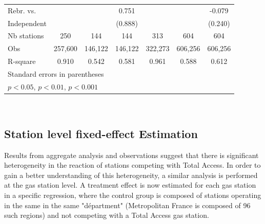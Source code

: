 \documentclass[11pt]{article}
\begin{document}
\begin{table}[h]
\begin{tabular}{lcccccc}
\hline
Rebr. vs.           &                                  &                               & 0.751                     &                                    &                                   & -0.079                      \\
Independent     &                                  &                               & (0.888)                  &                                    &                                    & (0.240)                     \\
\hline
Nb stations       & 250                           & 144                        & 144                         & 313                              & 604                            & 604                            \\
Obs                   & 257,600                    & 146,122                &  146,122                 & 322,273                      &  606,256                    & 606,256                     \\
R-square           & 0.910                        & 0.542                    &  0.581                     & 0.961                          &  0.588                        & 0.612                       \\
\hline\hline
\multicolumn{7}{l}{\footnotesize Standard errors in parentheses}\\
\multicolumn{7}{l}{\footnotesize \sym{*} \(p<0.05\), \sym{**} \(p<0.01\), \sym{***} \(p<0.001\)}\\
\end{tabular}
\\
\label{table:ta_fe_agg}
\end{table}

\subsection{Station level fixed-effect Estimation}

Results from aggregate analysis and observations suggest that there is significant heterogeneity in the reaction of stations competing with Total Access. In order to gain a better understanding of this heterogeneity, a similar analysis is performed at the gas station level. A treatment effect is now estimated for each gas station in a specific regression, where the control group is composed of stations operating in the same in the same "départment" (Metropolitan France is composed of 96 such regions) and not competing with a Total Access gas station.
\end{document}
